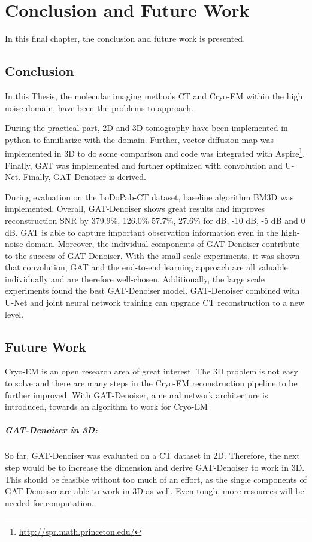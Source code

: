 \chapter{Conclusion and Future Work}
\label{sec:Conclusion}

In this final chapter, the conclusion and future work is presented.

\section{Conclusion}

In this Thesis, the molecular imaging methods CT and Cryo-EM
within the high noise domain, have been the problems to approach.

During the practical part, 2D and 3D tomography have been implemented 
in python to familiarize with the domain.
Further, vector diffusion map was implemented in 3D to do some comparison
and code was integrated with Aspire\footnote{\url{http://spr.math.princeton.edu/}}.
Finally, GAT was implemented and further optimized with convolution and U-Net.
Finally, GAT-Denoiser is derived.

During evaluation on the LoDoPab-CT dataset, baseline algorithm BM3D was implemented.
Overall, GAT-Denoiser shows great results and improves reconstruction SNR 
by 379.9\%, 126.0\% 57.7\%, 27.6\% for  dB, -10 dB, -5 dB and 0 dB.
GAT is able to capture important observation information even in the high-noise domain.
Moreover, the individual components of GAT-Denoiser contribute to the success of GAT-Denoiser.
With the small scale experiments, 
it was shown that convolution, GAT and the end-to-end learning approach are all valuable individually
and are therefore well-chosen.
Additionally, the large scale experiments found the best GAT-Denoiser model.
GAT-Denoiser combined with U-Net and joint neural network training can upgrade CT reconstruction to a new level. 


\section{Future Work}
Cryo-EM is an open research area of great interest.
The 3D problem is not easy to solve and there are many steps in the Cryo-EM reconstruction pipeline 
to be further improved. With GAT-Denoiser, a neural network architecture is introduced, 
towards an algorithm to work for Cryo-EM

\paragraph{GAT-Denoiser in 3D:}
So far, GAT-Denoiser was evaluated on a CT dataset in 2D.
Therefore, the next step would be to increase the dimension and 
derive GAT-Denoiser to work in 3D. This should be feasible without too much of an effort,
as the single components of GAT-Denoiser are able to work in 3D as well. 
Even tough, more resources will be needed for computation.

